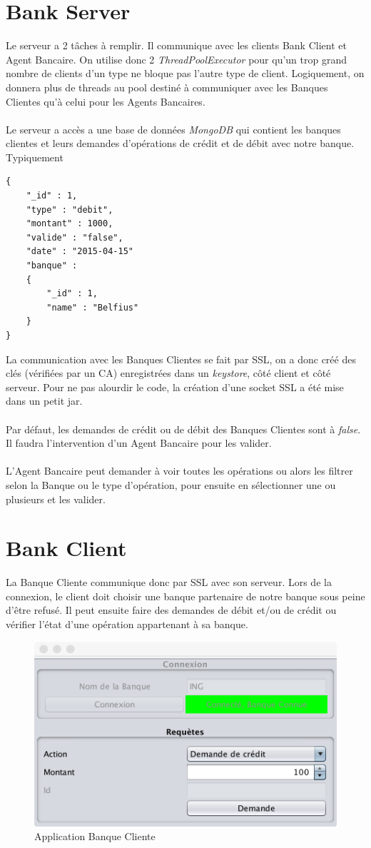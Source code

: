 \documentclass[11pt,fleqn]{article}
\begin{document}
\section{Bank Server}
Le serveur a 2 tâches à remplir. Il communique avec les clients Bank Client et Agent Bancaire. On utilise donc 2 \emph{ThreadPoolExecutor} pour qu'un trop grand nombre de clients d'un type ne bloque pas l'autre type de client. Logiquement, on donnera plus de threads au pool destiné à communiquer avec les Banques Clientes qu'à celui pour les Agents Bancaires.\\\\
Le serveur a accès a une base de données \emph{MongoDB} qui contient les banques clientes et leurs demandes d'opérations de crédit et de débit avec notre banque. Typiquement
\begin{lstlisting}
{
	"_id" : 1,
	"type" : "debit",
	"montant" : 1000,
	"valide" : "false",
	"date" : "2015-04-15"
	"banque" : 
	{
		"_id" : 1,
		"name" : "Belfius"
	}
}
\end{lstlisting}
La communication avec les Banques Clientes se fait par SSL, on a donc créé des clés (vérifiées par un CA) enregistrées dans un \emph{keystore}, côté client et côté serveur. Pour ne pas alourdir le code, la création d'une socket SSL a été mise dans un petit jar.\\\\
Par défaut, les demandes de crédit ou de débit des Banques Clientes sont à \emph{false}. Il faudra l'intervention d'un Agent Bancaire pour les valider.\\\\
L'Agent Bancaire peut demander à voir toutes les opérations ou alors les filtrer selon la Banque ou le type d'opération, pour ensuite en sélectionner une ou plusieurs et les valider.
\section{Bank Client}
La Banque Cliente communique donc par SSL avec son serveur. Lors de la connexion, le client doit choisir une banque partenaire de notre banque sous peine d'être refusé. Il peut ensuite faire des demandes de débit et/ou de crédit ou vérifier l'état d'une opération appartenant à sa banque.
\begin{figure}[H]
	\includegraphics[scale=0.5]{Images/BankClient}
	\centering
	\caption{Application Banque Cliente}
\end{figure}
\end{document}
